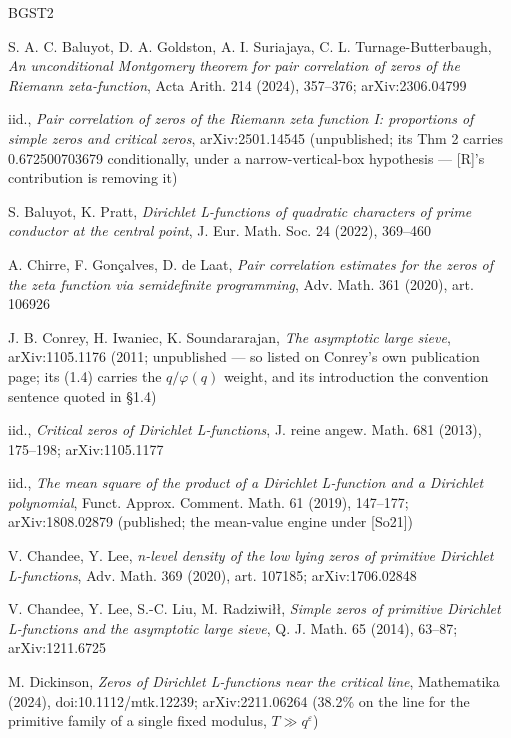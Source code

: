 \documentclass[11pt]{amsart}
\theoremstyle{plain}
\theoremstyle{remark}
\begin{document}
\begin{thebibliography}{BGST2}

 S. A. C. Baluyot, D. A. Goldston, A. I. Suriajaya,
C. L. Turnage-Butterbaugh, \emph{An unconditional Montgomery theorem for pair
correlation of zeros of the Riemann zeta-function}, Acta Arith. 214 (2024), 357--376;
arXiv:2306.04799

 iid., \emph{Pair correlation of zeros of the Riemann zeta
function I: proportions of simple zeros and critical zeros}, arXiv:2501.14545
(unpublished; its Thm 2 carries 0.672500703679 conditionally, under a
narrow-vertical-box hypothesis --- [R]'s contribution is removing it)

 S. Baluyot, K. Pratt, \emph{Dirichlet L-functions of quadratic
characters of prime conductor at the central point}, J. Eur. Math. Soc. 24 (2022),
369--460

 A. Chirre, F. Gon\c{c}alves, D. de Laat, \emph{Pair correlation
estimates for the zeros of the zeta function via semidefinite programming}, Adv.
Math. 361 (2020), art. 106926

 J. B. Conrey, H. Iwaniec, K. Soundararajan, \emph{The asymptotic
large sieve}, arXiv:1105.1176 (2011; unpublished --- so listed on Conrey's own
publication page; its (1.4) carries the $q/\varphi(q)$ weight, and its introduction
the convention sentence quoted in \S1.4)

 iid., \emph{Critical zeros of Dirichlet L-functions}, J. reine
angew. Math. 681 (2013), 175--198; arXiv:1105.1177

 iid., \emph{The mean square of the product of a Dirichlet
L-function and a Dirichlet polynomial}, Funct. Approx. Comment. Math. 61 (2019),
147--177; arXiv:1808.02879 (published; the mean-value engine under [So21])

 V. Chandee, Y. Lee, \emph{n-level density of the low lying zeros of
primitive Dirichlet L-functions}, Adv. Math. 369 (2020), art. 107185;
arXiv:1706.02848

 V. Chandee, Y. Lee, S.-C. Liu, M. Radziwi\l\l, \emph{Simple
zeros of primitive Dirichlet L-functions and the asymptotic large sieve}, Q. J. Math.
65 (2014), 63--87; arXiv:1211.6725

 M. Dickinson, \emph{Zeros of Dirichlet L-functions near the
critical line}, Mathematika (2024), doi:10.1112/mtk.12239; arXiv:2211.06264 (38.2\%
on the line for the primitive family of a single fixed modulus,
$T \gg q^\varepsilon$)


\end{thebibliography}
\end{document}
